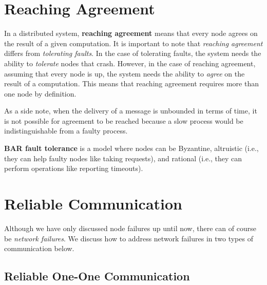 \documentclass[twoside]{article}
\begin{document}
\section{Reaching Agreement}  

In a distributed system, \textbf{reaching agreement} means that every node agrees on the result of a given computation. It is important to note that \emph{reaching agreement} differs from \emph{tolerating faults}. In the case of tolerating faults, the system needs the ability to \emph{tolerate} nodes that crash. However, in the case of reaching agreement, assuming that every node is up, the system needs the ability to \emph{agree} on the result of a computation. This means that reaching agreement requires more than one node by definition. 

As a side note, when the delivery of a message is unbounded in terms of time, it is not possible for agreement to be reached because a slow process would be indistinguishable from a faulty process. 

\textbf{BAR fault tolerance} is a model where nodes can be Byzantine, altruistic (i.e., they can help faulty nodes like taking requests), and rational (i.e., they can perform operations like reporting timeouts).

\section{Reliable Communication} 

Although we have only discussed node failures up until now, there can of course be \emph{network failures}. We discuss how to address network failures in two types of communication below.

\subsection{Reliable One-One Communication} 
\end{document}
